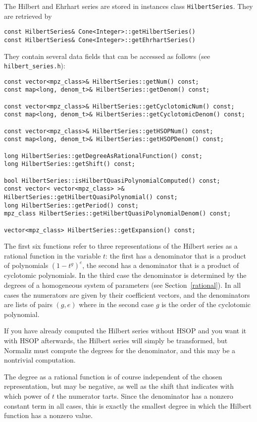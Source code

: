 \documentclass[12pt,a4paper]{scrartcl}
\theoremstyle{definition}
\begin{document}
\begin{small}
The Hilbert and Ehrhart series are stored in instances class \verb|HilbertSeries|. They are retrieved by
\begin{Verbatim}
const HilbertSeries& Cone<Integer>::getHilbertSeries()
const HilbertSeries& Cone<Integer>::getEhrhartSeries()
\end{Verbatim}
They contain several data fields that can be accessed as follows (see \verb|hilbert_series.h|):
\begin{Verbatim}
const vector<mpz_class>& HilbertSeries::getNum() const;
const map<long, denom_t>& HilbertSeries::getDenom() const;

const vector<mpz_class>& HilbertSeries::getCyclotomicNum() const;
const map<long, denom_t>& HilbertSeries::getCyclotomicDenom() const;

const vector<mpz_class>& HilbertSeries::getHSOPNum() const;
const map<long, denom_t>& HilbertSeries::getHSOPDenom() const;

long HilbertSeries::getDegreeAsRationalFunction() const;
long HilbertSeries::getShift() const;

bool HilbertSeries::isHilbertQuasiPolynomialComputed() const;
const vector< vector<mpz_class> >& HilbertSeries::getHilbertQuasiPolynomial() const;
long HilbertSeries::getPeriod() const;
mpz_class HilbertSeries::getHilbertQuasiPolynomialDenom() const;

vector<mpz_class> HilbertSeries::getExpansion() const;
\end{Verbatim}

The first six functions refer to three representations of the Hilbert series as a rational function in the variable $t$: the first has a denominator that is a product of polynomials $(1-t^g)^e$, the second has a denominator that is a product of cyclotomic polynomials. In the third case the denominator is determined by the degrees of a homogeneous system of parameters (see Section~\ref{rational}). In all cases the numerators are given by their coefficient vectors, and the denominators are lists of pairs $(g,e)$ where in the second case $g$ is the order of the cyclotomic polynomial.

If you have already computed the Hilbert series without HSOP and you want it with HSOP afterwards, the Hilbert series will simply be transformed, but Normaliz must compute the degrees for the denominator, and this may be a nontrivial computation.

The degree as a rational function is of course independent of the chosen representation, but may be negative, as well as the shift that indicates with which power of $t$ the numerator tarts. Since the denominator has a nonzero constant term in all cases, this is exactly the smallest degree in which the Hilbert function has a nonzero value.


\end{small}
\end{document}
